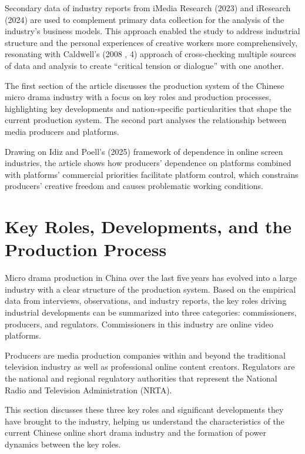 \documentclass[10pt,a4paper]{article}
\begin{document}
Secondary data of industry reports from iMedia Research (2023) and iResearch (2024) are used to complement primary data collection for the analysis of the industry’s business models. This approach enabled the study to address industrial structure and the personal experiences of creative workers more comprehensively, resonating with Caldwell’s (2008 , 4) approach of cross-checking multiple sources of data and analysis to create “critical tension or dialogue” with one another.\par
The first section of the article discusses the production system of the Chinese micro drama industry with a focus on key roles and production processes, highlighting key developments and nation-specific particularities that shape the current production system. The second part analyses the relationship between media producers and platforms.\par
Drawing on Idiz and Poell’s (2025) framework of dependence in online screen industries, the article shows how producers’ dependence on platforms combined with platforms’ commercial priorities facilitate platform control, which constrains producers’ creative freedom and causes problematic working conditions.\par
\section*{Key Roles, Developments, and the Production Process}
Micro drama production in China over the last five years has evolved into a large industry with a clear structure of the production system. Based on the empirical data from interviews, observations, and industry reports, the key roles driving industrial developments can be summarized into three categories: commissioners, producers, and regulators. Commissioners in this industry are online video platforms.\par
Producers are media production companies within and beyond the traditional television industry as well as professional online content creators. Regulators are the national and regional regulatory authorities that represent the National Radio and Television Administration (NRTA).\par
This section discusses these three key roles and significant developments they have brought to the industry, helping us understand the characteristics of the current Chinese online short drama industry and the formation of power dynamics between the key roles.\par
\end{document}
